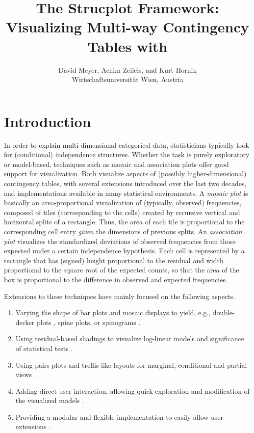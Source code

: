 \documentclass{Z}
\author{David Meyer, Achim Zeileis, \textnormal{and} Kurt 
Hornik\\Wirtschaftsuniversit\"at Wien, Austria}
\title{The Strucplot Framework:\\ Visualizing Multi-way Contingency
  Tables with \pkg{vcd}}
\begin{document}

\section[Introduction]{Introduction}


In order to explain multi-dimensional categorical data, statisticians
typically look for (conditional) independence structures. Whether the
task is purely exploratory or model-based, techniques such as mosaic and
association plots offer good support for visualization.  Both visualize
aspects of (possibly higher-dimensional) contingency tables, with
several extensions introduced over the last two decades, and
implementations available in many statistical environments.  A
\emph{mosaic plot} \citep{vcd:Hartigan+Kleiner:1984} is basically an
area-proportional visualization of (typically, observed) frequencies,
composed of tiles (corresponding to the cells) created by recursive
vertical and horizontal splits of a rectangle. Thus, the area of each tile
is proportional to the corresponding cell entry \emph{given} the
dimensions of previous splits. An \emph{association plot}
\citep{vcd:Cohen:1980} visualizes the standardized deviations of
observed frequencies from those expected under a certain independence
hypothesis.  Each cell is represented by a rectangle that has (signed)
height proportional to the residual and width proportional to the square
root of the expected counts, so that the area of the box is proportional
to the difference in observed and expected frequencies.

Extensions to these techniques have mainly focused on the following
aspects.

\begin{enumerate}
\item Varying the shape of bar plots and mosaic displays to yield, e.g.,
  double-decker plots \citep{vcd:hofmann:2001}, spine plots, or
  spinograms \citep{vcd:hofmann+theus}.
\item Using residual-based shadings to visualize log-linear models
  \citep{vcd:Friendly:1994,vcd:Friendly:2000} and significance of
  statistical tests \citep{vcd:Meyer+Zeileis+Hornik:2003,vcd:Zeileis+Meyer+Hornik:2005}.
\item Using pairs plots and trellis-like layouts for marginal, conditional and
  partial views \citep{vcd:Friendly:1999}.
\item Adding direct user interaction, allowing quick exploration and
  modification of the visualized models 
  \citep{vcd:Unwin+Hawkins+Hofmann:1996,vcd:Theus:2003}.
\item Providing a modular and flexible implementation to easily allow
  user extensions \citep{vcd:Meyer+Zeileis+Hornik:2003,vcd:Meyer+Zeileis+Hornik:2006b}.
\end{enumerate}
\end{document}
